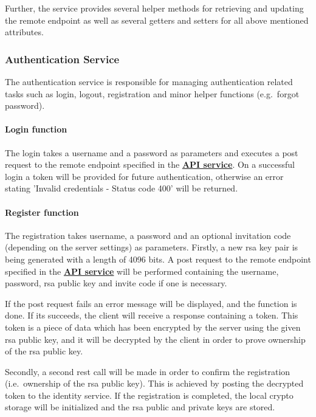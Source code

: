 Further, the service provides several helper methods for retrieving and updating the remote endpoint as well as several
getters and setters for all above mentioned attributes.

\subsubsection{Authentication Service}\label{subsubsec:auth-service}

The authentication service is responsible for managing authentication related tasks such as login, logout, registration
and minor helper functions (e.g.\ forgot password).

\paragraph{Login function}
The login takes a username and a password as parameters and executes a post request to the remote endpoint specified in
the \textbf{\hyperref[subsubsec:api-service]{API service}}.
On a successful login a token will be provided for future authentication, otherwise an error stating 'Invalid
credentials - Status code 400' will be returned.

\paragraph{Register function}
The registration takes username, a password and an optional invitation code (depending on the server settings) as
parameters.
Firstly, a new \ac{rsa} key pair is being generated with a length of 4096 bits.
A post request to the remote endpoint specified in the \textbf{\hyperref[subsubsec:api-service]{API service}} will be
performed containing the username, password, \ac{rsa} public key and invite code if one is necessary.

If the post request fails an error message will be displayed, and the function is done.
If its succeeds, the client will receive a response containing a token.
This token is a piece of data which has been encrypted by the server using the given \ac{rsa} public key, and it will
be decrypted by the client in order to prove ownership of the \ac{rsa} public key.

Secondly, a second \ac{rest} call will be made in order to confirm the registration (i.e.\ ownership of the \ac{rsa}
public key).
This is achieved by posting the decrypted token to the identity service.
If the registration is completed, the local crypto storage will be initialized and the \ac{rsa} public and private keys
are stored.

